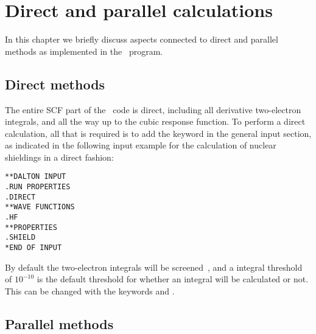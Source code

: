 \chapter{Direct and parallel calculations}\label{ch:dirpar}

In this chapter we briefly discuss aspects connected to
direct and parallel
methods as implemented in the \siraba\ program. 

\section{Direct methods}\label{sec:direct}

\begin{center}
\end{center}

The entire SCF part
of the \siraba\ code is direct, including all derivative two-electron
integrals, and all the way up to the cubic response function. To
perform a direct calculation, all that is
required is to add the 
keyword  in the general input section, as indicated in the
following input example for the calculation of nuclear
shieldings in a
direct fashion:

\begin{verbatim}
**DALTON INPUT
.RUN PROPERTIES
.DIRECT
**WAVE FUNCTIONS
.HF
**PROPERTIES
.SHIELD
*END OF INPUT
\end{verbatim}

By default the two-electron integrals will be
screened~\cite{krdjpnhatshjajpdthjcp108}, and a integral 
threshold of $10^{-10}$ is the default threshold for whether an
integral will be calculated or not. This can be changed with the
keywords  and .

\section{Parallel methods}\label{sec:parallel}

